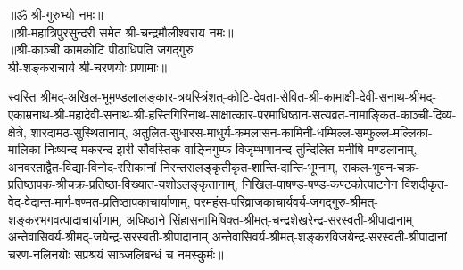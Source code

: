 \begin{center}
{॥ॐ श्री-गुरुभ्यो नमः॥}\\
{॥श्री-महात्रिपुरसुन्दरी समेत श्री-चन्द्रमौलीश्वराय नमः॥}\\
{॥श्री-काञ्ची कामकोटि पीठाधिपति जगद्गुरु\\ श्री-शङ्कराचार्य श्री-चरणयोः प्रणामाः॥}
\end{center}

\noindent स्वस्ति श्रीमद्-अखिल-भूमण्डलालङ्कार-त्रयस्त्रिंशत्-कोटि-देवता-सेवित-श्री-कामाक्षी-देवी-सनाथ-श्रीमद्-एकाम्रनाथ-श्री-महादेवी-सनाथ-श्री-हस्तिगिरिनाथ-साक्षात्कार-परमाधिष्ठान-सत्यव्रत-नामाङ्कित-काञ्ची-दिव्य-क्षेत्रे, शारदामठ-सुस्थितानाम्,
अतुलित-सुधारस-माधुर्य-कमलासन-कामिनी-धम्मिल्ल-सम्फुल्ल-मल्लिका-मालिका-निःष्यन्द-मकरन्द-झरी-सौवस्तिक-वाङ्निगुम्फ-विजृम्भणानन्द-तुन्दिलित-मनीषि-मण्डलानाम्,
अनवरताद्वैत-विद्या-विनोद-रसिकानां निरन्तरालङ्कृतीकृत-शान्ति-दान्ति-भूम्नाम्,
सकल-भुवन-चक्र-प्रतिष्ठापक-श्रीचक्र-प्रतिष्ठा-विख्यात-यशोऽलङ्कृतानाम्,
निखिल-पाषण्ड-षण्ड-कण्टकोत्पाटनेन विशदीकृत-वेद-वेदान्त-मार्ग-षण्मत-प्रतिष्ठापकाचार्याणाम्,
परमहंस-परिव्राजकाचार्यवर्य-जगद्गुरु-श्रीमत्-शङ्करभगवत्पादाचार्याणाम्,
अधिष्ठाने सिंहासनाभिषिक्त-श्रीमत्-चन्द्रशेखरेन्द्र-सरस्वती-श्रीपादानाम् अन्तेवासिवर्य-श्रीमद्-जयेन्द्र-सरस्वती-श्रीपादानाम् अन्तेवासिवर्य-श्रीमत्-शङ्करविजयेन्द्र-सरस्वती-श्रीपादानां चरण-नलिनयोः सप्रश्रयं साञ्जलिबन्धं च नमस्कुर्मः॥